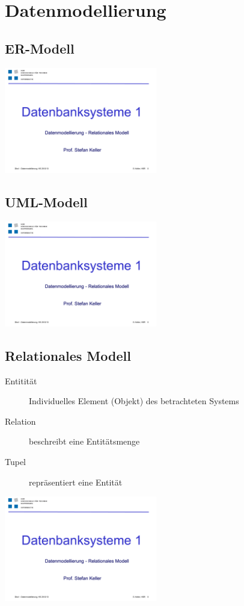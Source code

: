 \section{Datenmodellierung}
    \subsection{ER-Modell}
        \includegraphics[page=16,trim=20 120 20 140,clip=true,width=0.5\textwidth]{images/datenmodellierung.pdf}
    \subsection{UML-Modell}
        \includegraphics[page=29,trim=20 30 20 85,clip=true,width=0.5\textwidth]{images/datenmodellierung.pdf}
    \subsection{Relationales Modell}
        \begin{description}
            \item[Entitität] Individuelles Element (Objekt) des betrachteten Systems
            \item[Relation] beschreibt eine Entitätsmenge
            \item[Tupel] repräsentiert eine Entität
        \end{description}
        \includegraphics[page=42,trim=10 30 0 84,clip=true,width=0.5\textwidth]{images/datenmodellierung.pdf}
